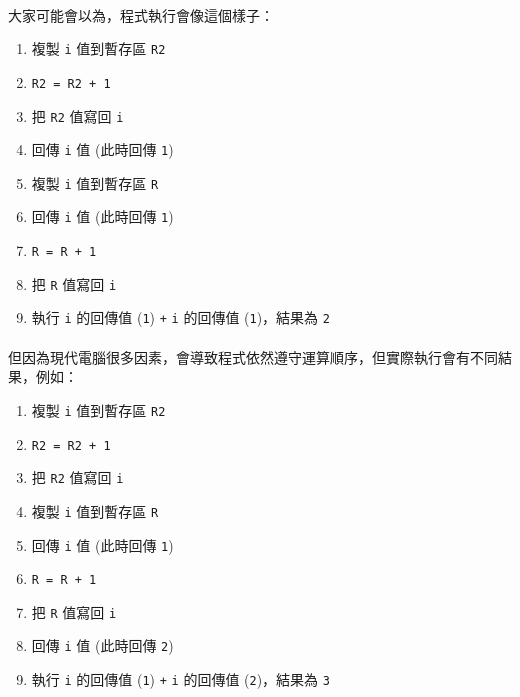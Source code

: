 \documentclass[12pt,a4paper,oneside]{article}
\begin{document}
\begin{CJK}{UTF8}{bkai}
\paragraph{}大家可能會以為，程式執行會像這個樣子：
\begin{enumerate}
\item {\color{red}複製 \lstinline!i! 值到暫存區 \lstinline!R2!}
\item {\color{red}\lstinline!R2 = R2 + 1!}
\item {\color{red}把 \lstinline!R2! 值寫回 \lstinline!i!}
\item {\color{red}回傳 \lstinline!i! 值} (此時回傳 \lstinline!1!)
\item {\color{blue}複製 \lstinline!i! 值到暫存區 \lstinline!R!}
\item {\color{blue}回傳 \lstinline!i! 值} (此時回傳 \lstinline!1!)
\item {\color{blue}\lstinline!R = R + 1!}
\item {\color{blue}把 \lstinline!R! 值寫回 \lstinline!i!}
\item 執行 \lstinline!i! 的回傳值 ({\color{blue}\lstinline!1!}) \lstinline!+! \lstinline!i! 的回傳值 ({\color{red}\lstinline!1!})，結果為 \lstinline!2!
\end{enumerate}

\paragraph{}但因為現代電腦很多因素，會導致程式依然遵守運算順序，但實際執行會有不同結果，例如：
\begin{enumerate}
\item {\color{red}複製 \lstinline!i! 值到暫存區 \lstinline!R2!}
\item {\color{red}\lstinline!R2 = R2 + 1!}
\item {\color{red}把 \lstinline!R2! 值寫回 \lstinline!i!}
\item {\color{blue}複製 \lstinline!i! 值到暫存區 \lstinline!R!}
\item {\color{blue}回傳 \lstinline!i! 值} (此時回傳 \lstinline!1!)
\item {\color{blue}\lstinline!R = R + 1!}
\item {\color{blue}把 \lstinline!R! 值寫回 \lstinline!i!}
\item {\color{red}回傳 \lstinline!i! 值} (此時回傳 \lstinline!2!)
\item 執行 \lstinline!i! 的回傳值 ({\color{blue}\lstinline!1!}) \lstinline!+! \lstinline!i! 的回傳值 ({\color{red}\lstinline!2!})，結果為 \lstinline!3!
\end{enumerate}


\end{CJK}
\end{document}

